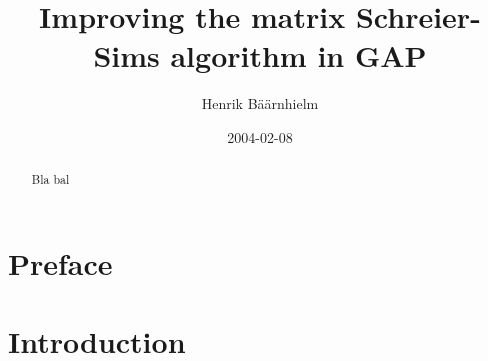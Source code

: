 \documentclass[draft]{amsart}
\title{Improving the matrix Schreier-Sims algorithm in GAP}
\author{Henrik B\"a\"arnhielm}
\date{2004-02-08}
\theoremstyle{plain}
\theoremstyle{definition}
\theoremstyle{remark}
\begin{document}
\begin{titlepage}
\begin{abstract}
Bla bal
\end{abstract}


\maketitle
\thispagestyle{empty}

\end{titlepage}

\tableofcontents

\newpage

\section{Preface}

\section{Introduction} \label{intro}

 

\end{document}

